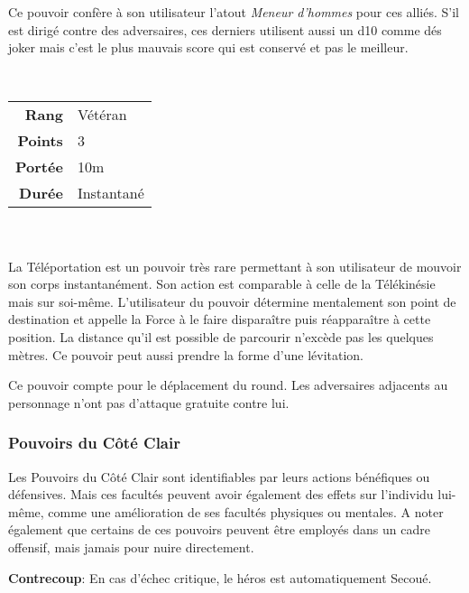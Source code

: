 \begin{description}[align=left]
        Ce pouvoir confère à son utilisateur l’atout \emph{Meneur d’hommes} pour ces alliés. S’il est dirigé contre des adversaires, ces derniers utilisent aussi un d10 comme dés joker mais c’est le plus mauvais score qui est conservé et pas le meilleur.
        \\

    \item [Téléportation] ~ \\

        \begin{tabular}{ r l }
            \textbf{Rang}    & Vétéran \\
            \textbf{Points}  & 3 \\
            \textbf{Portée}  & 10m \\
            \textbf{Durée}   & Instantané \\
        \end{tabular}
        \\ \\
        La Téléportation est un pouvoir très rare permettant à son utilisateur de mouvoir son corps instantanément. Son action est comparable à celle de la Télékinésie mais sur soi-même. L’utilisateur du pouvoir détermine mentalement son point de destination et appelle la Force à le faire disparaître puis réapparaître à cette position. La distance qu’il est possible de parcourir n’excède pas les quelques mètres. Ce pouvoir peut aussi prendre la forme d’une lévitation.

        Ce pouvoir compte pour le déplacement du round. Les adversaires adjacents au personnage n’ont pas d’attaque gratuite contre lui.
        \\

\end{description}

\newpage
\subsubsection{Pouvoirs du Côté Clair}

Les Pouvoirs du Côté Clair sont identifiables par leurs actions bénéfiques ou défensives. Mais ces facultés peuvent avoir également des effets sur l’individu lui-même, comme une amélioration de ses facultés physiques ou mentales. A noter également que certains de ces pouvoirs peuvent être employés dans un cadre offensif, mais jamais pour nuire directement. 

\textbf{Contrecoup}: En cas d’échec critique, le héros est automatiquement Secoué.


